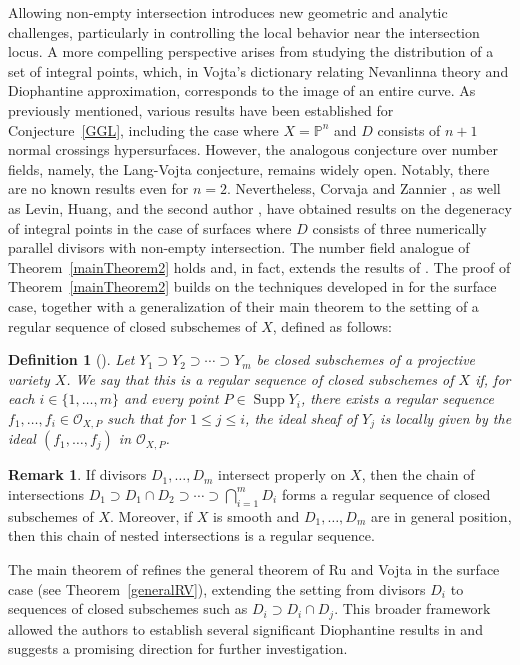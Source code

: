 \documentclass[10pt]{amsart}
\numberwithin{equation}{section}
\theoremstyle{plain}
\newtheorem{definition}[theorem]{Definition}
\theoremstyle{definition}
\newtheorem{remark}[theorem]{Remark}
\DeclareMathOperator{\Supp}{Supp}
\begin{document}
Allowing non-empty intersection introduces new geometric and analytic challenges, particularly in controlling the local behavior near the intersection locus. A more compelling perspective arises from studying the distribution of a set of integral points, which, in Vojta's dictionary relating Nevanlinna theory and Diophantine approximation, corresponds to the image of an entire curve.   As previously mentioned, various results have been established for Conjecture~\ref{GGL}, including the case where  $X=\mathbb P^n$ and $D$ consists of $n+1$ normal crossings hypersurfaces.  However, the analogous conjecture over number fields, namely, the Lang-Vojta conjecture, remains widely open. Notably, there are no known results even for $n=2$.     Nevertheless, Corvaja and Zannier \cite{CZ00}, as well as Levin, Huang, and the second author  \cite{HLX}, have obtained results on the degeneracy of integral points in the case of surfaces where 
$D$ consists of three numerically parallel divisors with non-empty intersection. The number field analogue of Theorem~\ref{mainTheorem2} holds and, in fact, extends the results of \cite{HLX}.  The proof of Theorem~\ref{mainTheorem2} builds on the  techniques  developed in \cite{HLX} for the surface case, together with a generalization of their main theorem to the setting of a regular sequence of closed subschemes of $X$, defined as follows:

\begin{definition}[{\cite[Definition 2.14]{HLX}}]
Let $Y_1\supset Y_2\supset \cdots\supset Y_m$ be closed subschemes of a projective variety $X$. We say that this is a {\it regular sequence of closed subschemes of $X$} if, for each $i\in \{1,\ldots, m\}$ and every point $P\in \Supp Y_i$, there exists a regular sequence $f_1,\ldots, f_i\in \mathcal{O}_{X,P}$ such that for $1\leq j\leq i$, the ideal sheaf of $Y_j$ is locally given by the ideal $(f_1,\ldots, f_j)$ in $\mathcal{O}_{X,P}$.
\end{definition}
\begin{remark}
    If divisors $D_1,\ldots, D_m$ intersect properly on $X$, then the chain of intersections $D_1\supset D_1\cap D_2\supset\cdots\supset \bigcap_{i=1}^m D_i$ forms a regular sequence of closed subschemes of $X$. Moreover, if $X$   is smooth and  $D_1,\ldots,D_m$ are in general position, then this chain of nested intersections is a regular sequence.
    \end{remark}

 The main theorem of \cite{HLX} refines the general theorem of Ru and Vojta \cite{RV20} in the surface case (see Theorem~\ref{generalRV}), extending the setting from divisors $D_i$ to sequences of closed subschemes such as $D_i \supset D_i \cap D_j$. This broader framework allowed the authors to establish several significant Diophantine results in \cite{HLX} and suggests a promising direction for further investigation.
\end{document}
